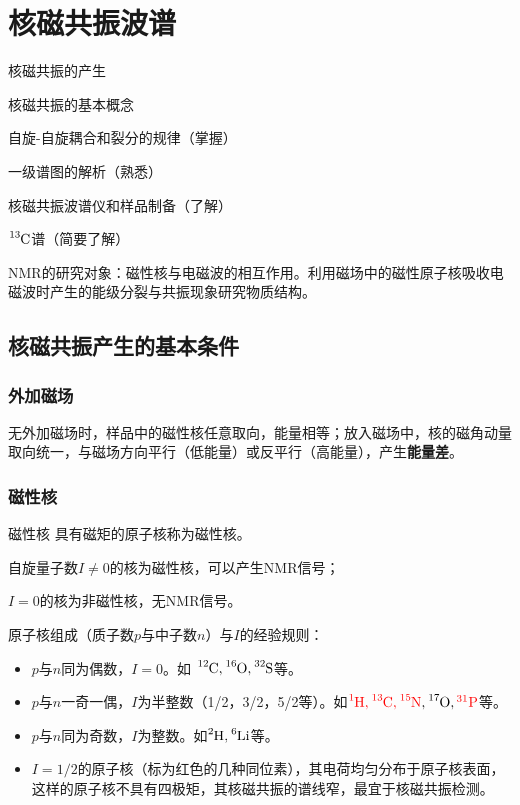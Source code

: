 \chapter{核磁共振波谱}

\begin{introduction}
	\item 核磁共振的产生
	\item 核磁共振的基本概念
	\item 自旋-自旋耦合和裂分的规律（掌握）
	\item 一级谱图的解析（熟悉）
	\item 核磁共振波谱仪和样品制备（了解）
	\item $\ce{^{13}C}$谱（简要了解）
\end{introduction}

NMR的研究对象：磁性核与电磁波的相互作用。利用磁场中的磁性原子核吸收电磁波时产生的能级分裂与共振现象研究物质结构。

\section{核磁共振产生的基本条件}
\subsection{外加磁场}
无外加磁场时，样品中的磁性核任意取向，能量相等；放入磁场中，核的磁角动量取向统一，与磁场方向平行（低能量）或反平行（高能量），产生\textbf{能量差}。

\subsection{磁性核}
\begin{definition*}{磁性核}{}
	具有磁矩的原子核称为磁性核。
	
	自旋量子数$I\neq 0$的核为磁性核，可以产生NMR信号；
	
	$I = 0$的核为非磁性核，无NMR信号。
\end{definition*}

原子核组成（质子数$p$与中子数$n$）与$I$的经验规则：
\begin{itemize}
	\item $p$与$n$同为偶数，$I = 0$。如 $\ce{^{12}C, ^{16}O, ^{32}S}$等。
	\item $p$与$n$一奇一偶，$I$为半整数（1/2，3/2，5/2等）。如$\textcolor{red}{\ce{^{1}H, ^{13}C, ^{15}N}},\ce{^{17}O, \textcolor{red}{^{31}P}}$等。
	\item $p$与$n$同为奇数，$I$为整数。如$\ce{^{2}H, ^{6}Li}$等。
	\item $I=1/2$的原子核（标为红色的几种同位素），其电荷均匀分布于原子核表面，这样的原子核不具有四极矩，其核磁共振的谱线窄，最宜于核磁共振检测。
\end{itemize}

